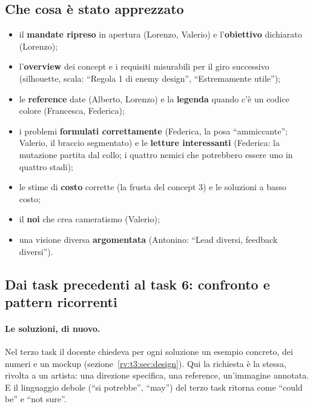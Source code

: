 \subsection{Che cosa è stato apprezzato}
\label{rv:t6:sec:apprezzato}

\begin{itemize}
  \item il \textbf{mandate ripreso} in apertura (Lorenzo, Valerio) e
        l'\textbf{obiettivo} dichiarato (Lorenzo);
  \item l'\textbf{overview} dei concept e i requisiti misurabili per il giro
        successivo (silhouette, scala: ``Regola 1 di enemy design'',
        ``Estremamente utile'');
  \item le \textbf{reference} date (Alberto, Lorenzo) e la \textbf{legenda}
        quando c'è un codice colore (Francesca, Federica);
  \item i problemi \textbf{formulati correttamente} (Federica, la posa
        ``ammiccante''; Valerio, il braccio segmentato) e le \textbf{letture
        interessanti} (Federica: la mutazione partita dal collo; i quattro
        nemici che potrebbero essere uno in quattro stadi);
  \item le stime di \textbf{costo} corrette (la frusta del concept 3) e le
        soluzioni a basso costo;
  \item il \textbf{noi} che crea cameratismo (Valerio);
  \item una visione diversa \textbf{argomentata} (Antonino: ``Lead diversi,
        feedback diversi'').
\end{itemize}

\subsection{Dai task precedenti al task 6: confronto e pattern ricorrenti}
\label{rv:t6:sec:confronto}

\paragraph{Le soluzioni, di nuovo.} Nel terzo task il docente chiedeva per
ogni soluzione un esempio concreto, dei numeri e un mockup
(sezione~\ref{rv:t3:sec:design}). Qui la richiesta è la stessa, rivolta a un
artista: una direzione specifica, una reference, un'immagine annotata. E il
linguaggio debole (``si potrebbe'', ``may'') del terzo task ritorna come
``could be'' e ``not sure''.

